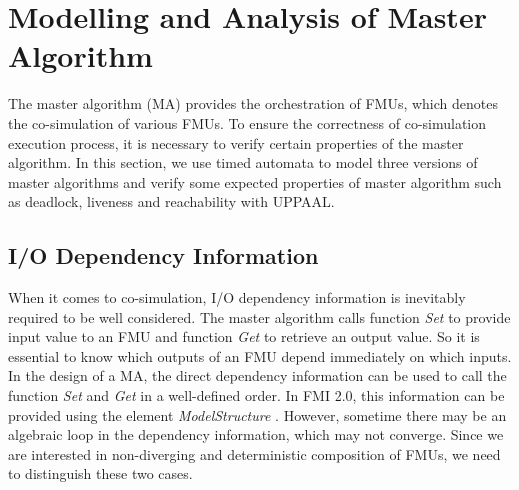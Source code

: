 \section{Modelling and Analysis of Master Algorithm}
\label{sec:ma}
The master algorithm (MA) provides the orchestration of FMUs, which denotes the co-simulation of various FMUs. To ensure the correctness of co-simulation execution process, it is necessary to verify certain properties of the master algorithm. In this section, we use timed automata to model three versions of master algorithms and verify some expected properties of master algorithm such as deadlock, liveness and reachability with UPPAAL.
\subsection{I/O Dependency Information}
When it comes to co-simulation, I/O dependency information \cite{BromanBGLMTW13} is inevitably required to be well considered. The master algorithm calls function \emph{Set} to provide input value to an FMU and function \emph{Get} to retrieve an output value. So it is essential to know which outputs of an FMU depend immediately on which inputs. In the design of a MA, the direct dependency information can be used to call the function \emph{Set} and \emph{Get} in a well-defined order. In FMI 2.0, this information can be provided using the element \emph{ModelStructure} \cite{FMI2INTRO}. However, sometime there may be an algebraic loop in the dependency information, which may not converge. Since we are interested in non-diverging and deterministic composition of FMUs, we need to distinguish these two cases. 
